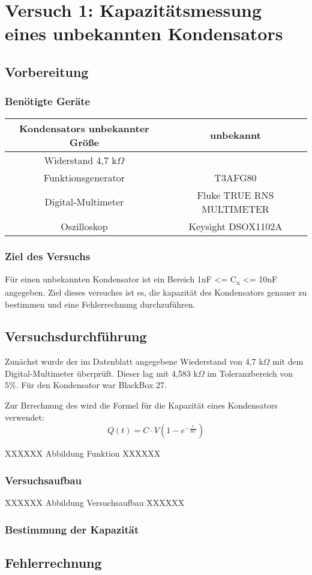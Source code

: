 \chapter{Versuch 1: Kapazitätsmessung eines unbekannten Kondensators}

\section{Vorbereitung}
\subsection*{Benötigte Geräte}

\begin{tabular}[h]{c|c}
    Kondensators unbekannter Größe & unbekannt \\
    \hline
    Widerstand 4,7 k$\Omega$& \\
    \hline
    Funktionsgenerator & T3AFG80\\
    \hline
    Digital-Multimeter & Fluke TRUE RNS MULTIMETER\\
    \hline
    Oszilloskop & Keysight DSOX1102A
    \label{tab:Versuch 1: Geräte}
\end{tabular}

\subsection*{Ziel des Versuchs}
Für einen unbekannten Kondensator ist ein Bereich 1nF <= C\textsubscript{x} <= 10nF 
angegeben. Ziel dieses versuches ist es, die kapazität des Kondensators genauer
zu bestimmen und eine Fehlerrechnung durchzuführen.

\section{Versuchsdurchführung}

Zunächst wurde der im Datenblatt angegebene Wiederstand von 4,7 k$\Omega$ 
mit dem Digital-Multimeter überprüft. Dieser lag mit 4,583 k$\Omega$ im 
Toleranzbereich von 5\%. Für den Kondensator war BlackBox 27.

Zur Brrechnung des wird die Formel für die Kapazität eines Kondensators verwendet:
\begin{equation}
    Q(t) = C \cdot V \left(1 - e^{-\frac{t}{RC}}\right)
\end{equation}

XXXXXX Abbildung Funktion XXXXXX

\subsection*{Versuchsaufbau}

XXXXXX Abbildung Versuchsaufbau XXXXXX

\subsection*{Bestimmung der Kapazität}

\section{Fehlerrechnung}



